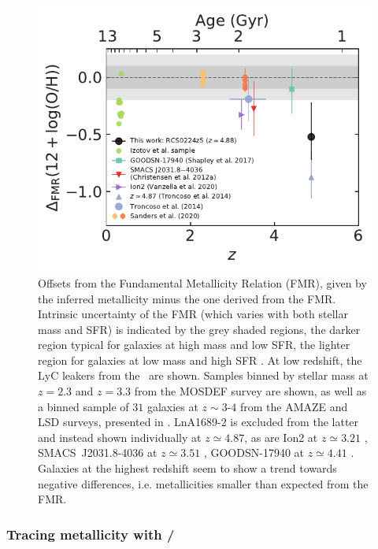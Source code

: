 \begin{figure}
    \centering
    \includegraphics[width=\linewidth]{"Plots/Chapter2/Delta_FMR"}
    \caption[Offsets from the FMR]{Offsets from the Fundamental Metallicity Relation (FMR), given by the inferred metallicity minus the one derived from the FMR. Intrinsic uncertainty of the FMR (which varies with both stellar mass and SFR) is indicated by the grey shaded regions, the darker region typical for galaxies at high mass and low SFR, the lighter region for galaxies at low mass and high SFR \citep[for details, see][]{2020MNRAS.491..944C}. At low redshift, the LyC leakers from the \Isample\ are shown. Samples binned by stellar mass at $z = 2.3$ and $z = 3.3$ from the MOSDEF survey \citep{2021ApJ...914...19S} are shown, as well as a binned sample of $31$ galaxies at $z \sim 3$-$4$ from the AMAZE and LSD surveys, presented in \citet{2014A&A...563A..58T}. LnA1689-2 is excluded from the latter and instead shown individually at $z \simeq 4.87$, as are Ion2 at $z \simeq 3.21$ \citep{2020MNRAS.491.1093V}, SMACS~J2031.8-4036 at $z \simeq 3.51$ \citep{2012MNRAS.427.1953C}, GOODSN-17940 at $z \simeq 4.41$ \citep{2017ApJ...846L..30S}. Galaxies at the highest redshift seem to show a trend towards negative differences, i.e. metallicities smaller than expected from the FMR.}
    \label{fig:NeIII/OII delta FMR}
\end{figure}

\subsubsection{Tracing metallicity with \texorpdfstring{\NeIII/\OII}{[NeIII]/[OII]}}
\label{sssec:Tracing metallicity with NeIII/OII}

